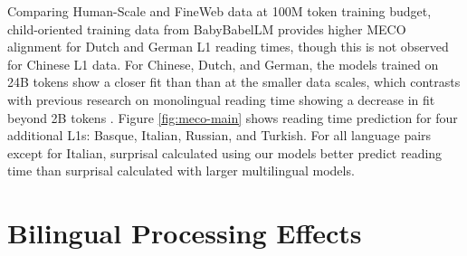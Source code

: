 \documentclass[11pt]{article}
\newcommand{\beetle}{Beetle} %
\begin{document}
Comparing Human-Scale and FineWeb data at 100M token training budget, child-oriented training data from BabyBabelLM \citep{jumelet2025babybabellmmultilingualbenchmarkdevelopmentally} provides higher MECO alignment for Dutch and German L1 reading times, though this is not observed for Chinese L1 data. 
For Chinese, Dutch, and German, the models trained on 24B tokens show a closer fit than than at the smaller data scales, which contrasts with previous research on monolingual reading time showing a decrease in fit beyond 2B tokens \citep{oh2023transformer}. Figure \ref{fig:meco-main} shows reading time prediction for four additional L1s: Basque, Italian, Russian, and Turkish. For all language pairs except for Italian, surprisal calculated using our models better predict reading time than surprisal calculated with larger multilingual models.



\section{Bilingual Processing Effects}\label{sec:bilingual-processing}

\end{document}
